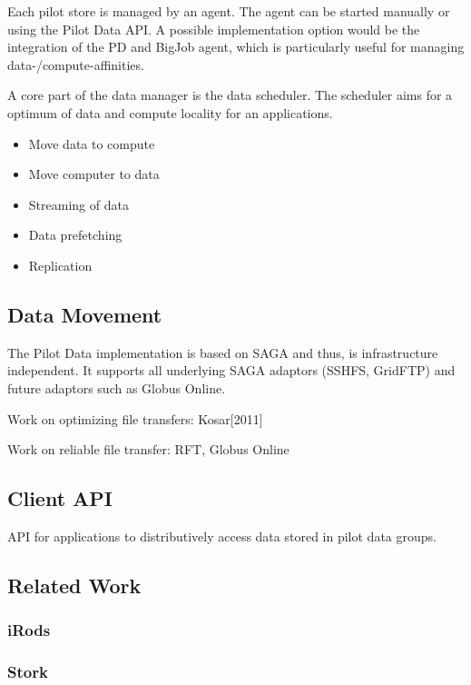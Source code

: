 \documentclass[]{article}
\begin{document}
Each pilot store is managed by an agent. The agent can be started manually or 
using the Pilot Data API. A possible implementation option would be the 
integration of the PD and BigJob agent, which is particularly useful for 
managing data-/compute-affinities.

A core part of the data manager is the data scheduler. The scheduler aims for a 
optimum of data and compute locality for an applications.
\begin{itemize}
	\item Move data to compute
	\item Move computer to data
	\item Streaming of data
	\item Data prefetching 
	\item Replication
\end{itemize}



\subsection{Data Movement}

The Pilot Data implementation is based on SAGA and thus, is infrastructure
independent. It supports all underlying SAGA adaptors (SSHFS, GridFTP) and
future adaptors such as Globus Online.

Work on optimizing file transfers: Kosar[2011]

Work on reliable file transfer: RFT, Globus Online

\subsection{Client API}

API for applications to distributively access data stored in pilot data groups.

\subsection{Related Work}

\subsubsection{iRods}


\subsubsection{Stork}
\end{document}

